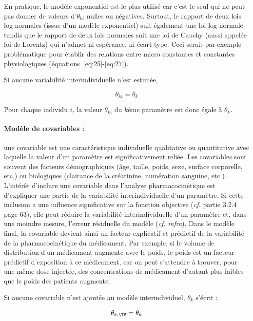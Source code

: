 En pratique, le modèle exponentiel est le plus utilisé car c'est le seul qui ne peut pas donner de valeurs d'$\theta_{ki}$ nulles ou négatives. Surtout, le rapport de deux lois log-normales (issue d'un modèle exponentiel) suit également une loi log-normale tandis que le rapport de deux lois normales suit une loi de Cauchy (aussi appelée loi de Lorentz) qui n'admet ni espérance, ni écart-type. Ceci serait par exemple problématique pour établir des relations entre micro constantes et constantes physiologiques (équations~\ref{eq:25}-\ref{eq:27}). 

Si aucune variabilité interindividuelle n'est estimée,

\begin{equation}
\theta_{ki} = \theta_k
\label{eq:43}
\end{equation}

Pour chaque individu $i$, la valeur $\theta_{ki}$ du $k$éme paramètre est donc égale à $\theta_k$.

\paragraph*{Modèle de covariables :} une covariable est une caractéristique individuelle qualitative ou quantitative avec laquelle la valeur d'un paramètre est significativement reliée. Les covariables sont souvent des facteurs démographiques (âge, taille, poids, sexe, surface corporelle, etc.) ou biologiques (clairance de la créatinine, numération sanguine, etc.). L'intérêt d'inclure une covariable dans l'analyse pharmacocinétique est d'expliquer une partie de la variabilité interindividuelle d'un paramètre. Si cette inclusion a une influence significative sur la fonction objective (\textit{cf.} partie 3.2.4 page 63), elle peut réduire la variabilité interindividuelle d'un paramètre et, dans une moindre mesure, l'erreur résiduelle du modèle (\textit{cf.} \textit{infra}). Dans le modèle final, la covariable devient ainsi un facteur explicatif et prédictif de la variabilité de la pharmacocinétique du médicament. Par exemple, si le volume de distribution d'un médicament augmente avec le poids, le poids est un facteur prédictif d'exposition à ce médicament, car on peut s'attendre à trouver, pour une même dose injectée, des concentrations de médicament d'autant plus faibles que le poids des patients augmente. 

Si aucune covariable n'est ajoutée au modèle interindividuel, $\theta_k$ s'écrit :

\begin{equation}
\theta_{k, \TV} = \theta_k
\label{eq:44}
\end{equation}

